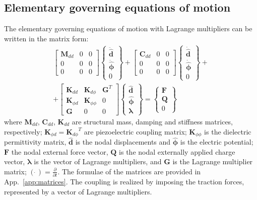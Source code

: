 \documentclass[materials,article,submit,moreauthors,pdftex]{Definitions/mdpi}
\begin{document}
\subsection{Elementary governing equations of motion}
\label{sec:motion}
The elementary governing equations of motion with Lagrange multipliers can be written in the matrix form:
\begin{eqnarray}
\left[
\begin{array}{ccc}
\textbf{M}_{dd} & 0 & 0\\
0 & 0 & 0\\
0 & 0 & 0
\end{array} \right]
\left \{
\begin{array}{c}
\ddot{\widehat{\textbf{d}}}\\
\ddot{\widehat{\boldsymbol{\phi}}}\\
0
\end{array} \right \}+
\left[
\begin{array}{ccc}
\textbf{C}_{dd} & 0 & 0\\
0 & 0 & 0\\
0 & 0 & 0
\end{array} \right]
\left \{
\begin{array}{c}
\dot{\widehat{\textbf{d}}}\\
\dot{\widehat{\boldsymbol{\phi}}}\\
0
\end{array} \right \}+\nonumber\\
+\left[
\begin{array}{ccc}
\textbf{K}_{dd} & \textbf{K}_{d\phi} & {\textbf{G}}^T\\
\textbf{K}_{\phi d} & \textbf{K}_{\phi \phi} & 0\\
\textbf{G} & 0 & 0
\end{array} \right]
\left \{
\begin{array}{c}
\widehat{\textbf{d}}\\
\widehat{\boldsymbol{\phi}}\\
\boldsymbol{\lambda}
\end{array} \right \}=
\left \{
\begin{array}{c}
\textbf{F}\\
\textbf{Q}\\
0
\end{array} \right \}
\label{eq:motion}
\end{eqnarray}
where \(\textbf{M}_{dd}\), \(\textbf{C}_{dd}\), \(\textbf{K}_{dd}\) are structural mass, damping and stiffness matrices, respectively; \(\textbf{K}_{\phi d}={\textbf{K}_{d\phi}}^T\) are piezoelectric coupling matrix; \(\textbf{K}_{\phi \phi}\) is the dielectric permittivity matrix, \(\widehat{\textbf{d}}\) is the nodal displacements and \(\widehat{\boldsymbol{\phi}}\) is the electric potential; \(\textbf{F}\) the nodal external force vector, \(\textbf{Q}\) is the nodal externally applied charge vector, \(\boldsymbol{\lambda}\) is the vector of Lagrange multipliers, and \(\textbf{G}\) is the Lagrange multiplier matrix; \((\dot{\ })=\frac{\partial}{\partial t}\).
The formulae of the matrices are provided in App.~\ref{app:matrices}.
The coupling is realized by imposing the traction forces, represented by a vector of Lagrange multipliers. 
\end{document}
